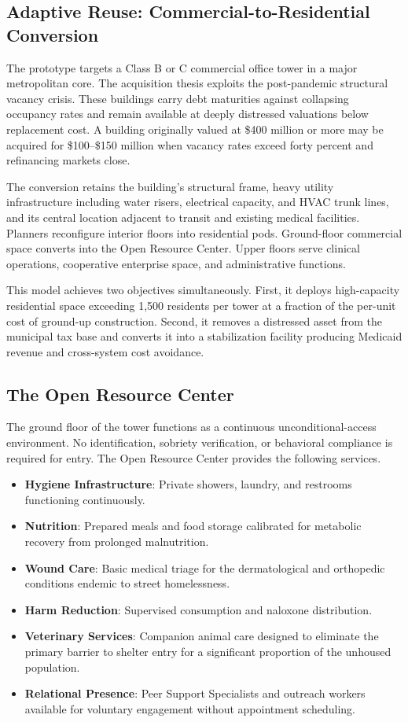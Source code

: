 \documentclass[12pt, letterpaper]{article}
\begin{document}
\subsection{Adaptive Reuse: Commercial-to-Residential Conversion}

The prototype targets a Class B or C commercial office tower in a major metropolitan core. The acquisition thesis exploits the post-pandemic structural vacancy crisis. These buildings carry debt maturities against collapsing occupancy rates and remain available at deeply distressed valuations below replacement cost. A building originally valued at \$400 million or more may be acquired for \$100--\$150 million when vacancy rates exceed forty percent and refinancing markets close.

The conversion retains the building's structural frame, heavy utility infrastructure including water risers, electrical capacity, and HVAC trunk lines, and its central location adjacent to transit and existing medical facilities. Planners reconfigure interior floors into residential pods. Ground-floor commercial space converts into the Open Resource Center. Upper floors serve clinical operations, cooperative enterprise space, and administrative functions.

This model achieves two objectives simultaneously. First, it deploys high-capacity residential space exceeding 1,500 residents per tower at a fraction of the per-unit cost of ground-up construction. Second, it removes a distressed asset from the municipal tax base and converts it into a stabilization facility producing Medicaid revenue and cross-system cost avoidance.

\subsection{The Open Resource Center}

The ground floor of the tower functions as a continuous unconditional-access environment. No identification, sobriety verification, or behavioral compliance is required for entry. The Open Resource Center provides the following services.

\begin{itemize}
    \item \textbf{Hygiene Infrastructure}: Private showers, laundry, and restrooms functioning continuously.
    \item \textbf{Nutrition}: Prepared meals and food storage calibrated for metabolic recovery from prolonged malnutrition.
    \item \textbf{Wound Care}: Basic medical triage for the dermatological and orthopedic conditions endemic to street homelessness.
    \item \textbf{Harm Reduction}: Supervised consumption and naloxone distribution.
    \item \textbf{Veterinary Services}: Companion animal care designed to eliminate the primary barrier to shelter entry for a significant proportion of the unhoused population.
    \item \textbf{Relational Presence}: Peer Support Specialists and outreach workers available for voluntary engagement without appointment scheduling.
\end{itemize}
\end{document}
